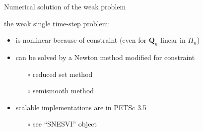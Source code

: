 \documentclass{beamer}
\newcommand\bQ{\mathbf{Q}}
\begin{document}
\begin{frame}{Numerical solution of the weak problem}

the weak single time-step problem:
\begin{itemize}
\item is nonlinear because of constraint (even for $\bQ_n$ linear in $H_n$)
\item can be solved by a Newton method modified for constraint
  \begin{itemize}
  \item[$\circ$]  reduced set method
  \item[$\circ$]  semismooth method
  \end{itemize}
\item scalable implementations are in PETSc 3.5
  \begin{itemize}
  \item[$\circ$]  see ``SNESVI'' object
  \end{itemize}
\end{itemize}
\end{frame}
\end{document}

